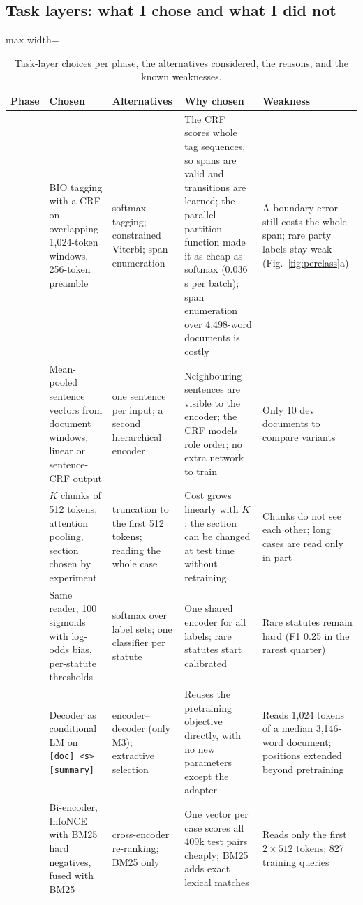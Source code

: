 \documentclass[11pt, oneside]{article}
\begin{document}
\subsection{Task layers: what I chose and what I did not}
\begin{table}[H]
\centering\scriptsize
\caption{Task-layer choices per phase, the alternatives considered, the reasons, and the known weaknesses.}
\label{tab:headwhy}
\begin{adjustbox}{max width=\textwidth}
\begin{tabular}{>{\raggedright\arraybackslash}p{0.6cm}>{\raggedright\arraybackslash}p{3.1cm}>{\raggedright\arraybackslash}p{3.1cm}>{\raggedright\arraybackslash}p{4.4cm}>{\raggedright\arraybackslash}p{3.6cm}}
\toprule
Phase & Chosen & Alternatives & Why chosen & Weakness\\
\midrule
2 & BIO tagging with a CRF on overlapping 1{,}024-token windows, 256-token preamble & softmax tagging; constrained
Viterbi; span enumeration & The CRF scores whole tag sequences, so spans are valid and transitions are learned; the parallel partition
function made it as cheap as softmax (0.036\,s per batch); span enumeration over 4{,}498-word documents is costly &
A boundary error still costs the whole span; rare party labels stay weak (Fig.~\ref{fig:perclass}a)\\
\addlinespace
3 & Mean-pooled sentence vectors from document windows, linear or sentence-CRF output & one sentence per input;
a second hierarchical encoder & Neighbouring sentences are visible to the encoder; the CRF models role order; no extra
network to train & Only 10 dev documents to compare variants\\
\addlinespace
4 & $K$ chunks of 512 tokens, attention pooling, section chosen by experiment & truncation to the first 512 tokens;
reading the whole case & Cost grows linearly with $K$; the section can be changed at test time without retraining & Chunks do not see
each other; long cases are read only in part\\
\addlinespace
5 & Same reader, 100 sigmoids with log-odds bias, per-statute thresholds & softmax over label sets; one classifier per
statute & One shared encoder for all labels; rare statutes start calibrated & Rare statutes remain hard (F1 0.25 in the
rarest quarter)\\
\addlinespace
6 & Decoder as conditional LM on \texttt{[doc] <s> [summary]} & encoder--decoder (only M3); extractive selection &
Reuses the pretraining objective directly, with no new parameters except the adapter & Reads 1{,}024 tokens of a
median 3{,}146-word document; positions extended beyond pretraining\\
\addlinespace
7 & Bi-encoder, InfoNCE with BM25 hard negatives, fused with BM25 & cross-encoder re-ranking; BM25 only & One vector per
case scores all 409k test pairs cheaply; BM25 adds exact lexical matches & Reads only the first $2\times512$ tokens; 827
training queries\\
\bottomrule
\end{tabular}
\end{adjustbox}
\end{table}
\end{document}
